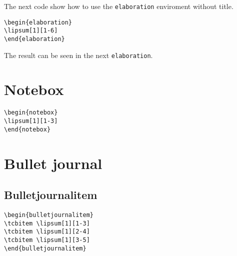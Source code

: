 The next code show how to use the \texttt{elaboration} enviroment without title.
\begin{highlightbox}
\begin{verbatim}
\begin{elaboration}
\lipsum[1][1-6]
\end{elaboration}
\end{verbatim}
\end{highlightbox}
The result can be seen in the next \texttt{elaboration}.
\begin{elaboration}
\lipsum[1][1-6]
\end{elaboration}


\section{Notebox}
\begin{highlightbox}
\begin{verbatim}
\begin{notebox}
\lipsum[1][1-3]
\end{notebox}
\end{verbatim}
\end{highlightbox}
\begin{notebox}
\lipsum[1][1-3]
\end{notebox}

\section{Bullet journal }

\subsection{Bulletjournalitem}

\lipsum[1][1-3]
\begin{highlightbox}
\begin{verbatim}
\begin{bulletjournalitem}
\tcbitem \lipsum[1][1-3]
\tcbitem \lipsum[1][2-4]
\tcbitem \lipsum[1][3-5]
\end{bulletjournalitem}
\end{verbatim}
\end{highlightbox}
\begin{bulletjournalitem}
\tcbitem \lipsum[1][1-3]
\tcbitem \lipsum[1][2-4]
\tcbitem \lipsum[1][3-5]
\end{bulletjournalitem}

